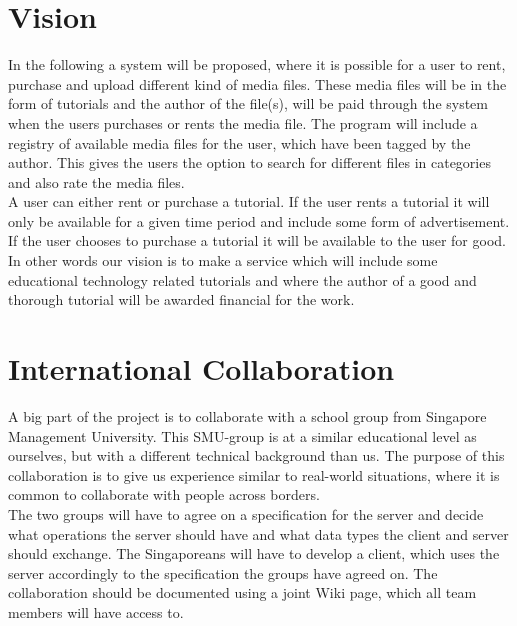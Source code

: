 \section{Vision}
In the following a system will be proposed, where it is possible for a user to rent, purchase and upload different kind of media files. These media files will be in the form of tutorials and the author of the file(s), will be paid through the system when the users purchases or rents the media file. The program will include a registry of available media files for the user, which have been tagged by the author. This gives the users the option to search for different files in categories and also rate the media files.\\

A user can either rent or purchase a tutorial. If the user rents a tutorial it will only be available for a given time period and include some form of advertisement. If the user chooses to purchase a tutorial it will be available to the user for good. \\ 
In other words our vision is to make a service which will include some educational technology related tutorials and  where the author of a good and thorough tutorial will be awarded financial for the work.

\section{International Collaboration}
A big part of the project is to collaborate with a school group from Singapore Management University. This SMU-group is at a similar educational level as ourselves, but with a different technical background than us. The purpose of this collaboration is to give us experience similar to real-world situations, where it is common to collaborate with people across borders.\\
The two groups will have to agree on a specification for the server and decide what operations the server should have and what data types the client and server should exchange.
The Singaporeans will have to develop a client, which uses the server accordingly to the specification the groups have agreed on. The collaboration should be documented using a joint Wiki page, which all team members will have access to. 

